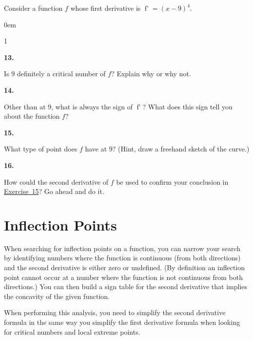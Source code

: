\documentclass[12pt,]{book}
\theoremstyle{plain}
\theoremstyle{definition}
\numberwithin{equation}{section}
\newenvironment{exercisegroup}%
{\medskip\noindent}%
{\par\bigskip}%
\newlength{\exercisegroupindent}%
\newlength{\exercisegroupitemwidth}%
\newenvironment{exercisegrouplist}%
{\vspace{-\partopsep}%
\begin{adjustwidth}{\exercisegroupindent}{0em}}%
{\end{adjustwidth}%
\vspace{-\partopsep}%
\vspace{\baselineskip}}%
\newenvironment{exercisegroupbycol}[1]%
{\begin{exercisegrouplist}%
\vspace{-\multicolsep}%
\begin{multicols}{#1}%
\setlength{\parindent}{0em}%
\setlength{\exercisegroupitemwidth}{\linewidth}}%
{\end{multicols}%
\vspace{-\multicolsep}%
\end{exercisegrouplist}}%
\newenvironment{exercisegroupitem}[1]%
{\begin{minipage}[t]{\exercisegroupitemwidth}
\vspace{0pt}%
{\bfseries#1}%
\rule{0pt}{\baselineskip}}{\strut%
\end{minipage}%
\hspace{\columnsep}}%
\providecommand\phantomsection{}
\newcommand{\fe}[2]{\mathop{{#1}{\left(#2\right)}}}
\newcommand{\fd}[1]{#1'}
\begin{document}
\begin{exercisegroup}%
Consider a function \(f\) whose first derivative is \(\fe{\fd{f}}{x}=(x-9)^4\).%
\par
\begin{exercisegroupbycol}{1}%
\begin{exercisegroupitem}{13. }\phantomsection\hypertarget{exercise-33}{\null}
Is \(9\) definitely a critical number of \(f\)? Explain why or why not.%
\end{exercisegroupitem}%
\par%
\begin{exercisegroupitem}{14. }\phantomsection\hypertarget{exercise-34}{\null}
Other than at \(9\), what is always the sign of \(\fe{\fd{f}}{x}\)? What does this sign tell you about the function \(f\)?%
\end{exercisegroupitem}%
\par%
\begin{exercisegroupitem}{15. }\phantomsection\hypertarget{exercise-what-type-of-critical-point}{\null}
What type of point does \(f\) have at \(9\)? (Hint, draw a freehand sketch of the curve.)%
\end{exercisegroupitem}%
\par%
\begin{exercisegroupitem}{16. }\phantomsection\hypertarget{exercise-36}{\null}
How could the second derivative of \(f\) be used to confirm your conclusion in \hyperref[exercise-what-type-of-critical-point]{Exercise~15}?  Go ahead and do it.%
\end{exercisegroupitem}%
\par%
\end{exercisegroupbycol}%
\end{exercisegroup}%
\typeout{************************************************}
\typeout{************************************************}
\section[Inflection Points]{Inflection Points}\label{section-inflection-points}
When searching for inflection points on a function, you can narrow your search by identifying numbers where the function is continuous (from both directions) and the second derivative is either zero or undefined.  (By definition an inflection point cannot occur at a number where the function is not continuous from both directions.)  You can then build a sign table for the second derivative that implies the concavity of the given function.%
\par
When performing this analysis, you need to simplify the second derivative formula in the same way you simplify the first derivative formula when looking for critical numbers and local extreme points.%
\typeout{************************************************}
\typeout{************************************************}
\end{document}
